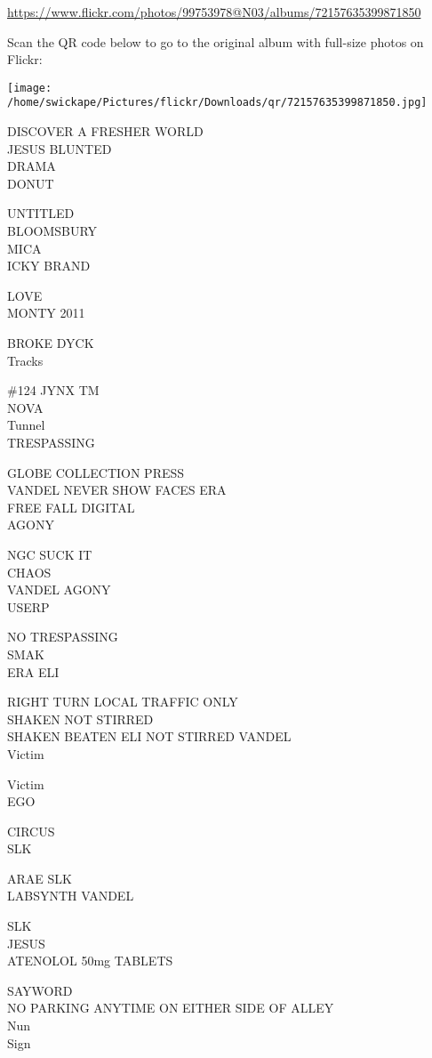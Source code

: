 \documentclass[10pt,letterpaper]{article}
\begin{document}
\url{https://www.flickr.com/photos/99753978@N03/albums/72157635399871850}

Scan the QR code below to go to the original album with full-size photos on Flickr:

\texttt{[image: /home/swickape/Pictures/flickr/Downloads/qr/72157635399871850.jpg]}


DISCOVER A FRESHER WORLD\\
JESUS BLUNTED\\
DRAMA\\
DONUT

UNTITLED\\
BLOOMSBURY\\
MICA\\
ICKY BRAND

LOVE\\
MONTY 2011

BROKE DYCK\\
Tracks

\#124 JYNX TM\\
NOVA\\
Tunnel\\
TRESPASSING

GLOBE COLLECTION PRESS\\
VANDEL NEVER SHOW FACES ERA\\
FREE FALL DIGITAL\\
AGONY

NGC SUCK IT\\
CHAOS\\
VANDEL AGONY\\
USERP

NO TRESPASSING\\
SMAK\\
ERA ELI

RIGHT TURN LOCAL TRAFFIC ONLY\\
SHAKEN NOT STIRRED\\
SHAKEN BEATEN ELI NOT STIRRED VANDEL\\
Victim

Victim\\
EGO

CIRCUS\\
SLK

ARAE SLK\\
LABSYNTH VANDEL

SLK\\
JESUS\\
ATENOLOL 50mg TABLETS

SAYWORD\\
NO PARKING ANYTIME ON EITHER SIDE OF ALLEY\\
Nun\\
Sign
\end{document}
